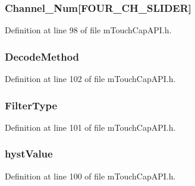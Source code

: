 \subsubsection[{Channel\+\_\+\+Num}]{ Channel\+\_\+\+Num\mbox{[}{\bf F\+O\+U\+R\+\_\+\+C\+H\+\_\+\+S\+L\+I\+D\+E\+R}\mbox{]}}\label{struct_s_l_i_d_e_r4_c_h_acee864b15d8e08cf361094031b626959}


Definition at line 98 of file m\+Touch\+Cap\+A\+P\+I.\+h.

\hypertarget{struct_s_l_i_d_e_r4_c_h_a3ec50eb50f016432fd63460deb50d4d3}{}
\subsubsection[{Decode\+Method}]{ Decode\+Method}\label{struct_s_l_i_d_e_r4_c_h_a3ec50eb50f016432fd63460deb50d4d3}


Definition at line 102 of file m\+Touch\+Cap\+A\+P\+I.\+h.

\hypertarget{struct_s_l_i_d_e_r4_c_h_a3ed3b2bb276c531333666858f705a254}{}
\subsubsection[{Filter\+Type}]{ Filter\+Type}\label{struct_s_l_i_d_e_r4_c_h_a3ed3b2bb276c531333666858f705a254}


Definition at line 101 of file m\+Touch\+Cap\+A\+P\+I.\+h.

\hypertarget{struct_s_l_i_d_e_r4_c_h_aee26e696540c8197e148cb9f0ccd4551}{}
\subsubsection[{hyst\+Value}]{ hyst\+Value}\label{struct_s_l_i_d_e_r4_c_h_aee26e696540c8197e148cb9f0ccd4551}


Definition at line 100 of file m\+Touch\+Cap\+A\+P\+I.\+h.

